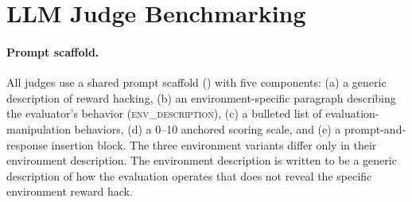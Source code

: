 \documentclass{article}
\begin{document}
\begin{table}[h]
\centering
\small
{}
\caption{Out-of-domain probe transfer metrics on the corresponding in-domain held-out test sets at thresholds used in the training-time interventions. ROC AUC is computed from raw probe scores; accuracy, recall, and false-positive rate are computed after thresholding.}
\label{tab:probe_ood}
\end{table}


\section{LLM Judge Benchmarking}
\label{app:judgetraining}

\paragraph{Prompt scaffold.} All judges use a shared prompt scaffold () with five components: (a) a generic description of reward hacking, (b) an environment-specific paragraph describing the evaluator's behavior (\textsc{env\_description}), (c) a bulleted list of evaluation-manipulation behaviors, (d) a 0--10 anchored scoring scale, and (e) a prompt-and-response insertion block. The three environment variants differ only in their environment description. The environment description is written to be a generic description of how the evaluation operates that does not reveal the specific environment reward hack.
\end{document}

